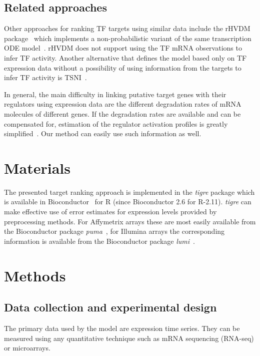 \documentclass[11pt]{article}
\newcommand{\Rpackage}[1]{\emph{#1}}
\newcommand{\tigre}[0]{\Rpackage{tigre}}
\begin{document}
\subsection{Related approaches}

Other approaches for ranking TF targets using similar data include the
rHVDM package~\cite{Barenco2009} which implements a non-probabilistic
variant of the same transcription ODE model~\cite{Barenco2006a}.
rHVDM does not support using the TF mRNA observations to infer TF
activity.  Another alternative that defines the model based only on
TF expression data without a possibility of using information from the
targets to infer TF activity is TSNI~\cite{Gatta2008}.

In general, the main difficulty in linking putative target genes with
their regulators using expression data are the different degradation
rates of mRNA molecules of different genes.  If the degradation rates
are available and can be compensated for, estimation of the regulator
activation profiles is greatly simplified~\cite{Barenco2009a}.  Our
method can easily use such information as well.

\section{Materials}

The presented target ranking approach is implemented in the \tigre{}
package which is available in Bioconductor~\cite{Gentleman2004} for R
(since Bioconductor 2.6 for R-2.11).  \tigre{} can make effective use
of error estimates for expression levels provided by preprocessing
methods.  For Affymetrix arrays these are most easily available from
the Bioconductor package \Rpackage{puma}~\cite{Pearson2009}, for
Illumina arrays the corresponding information is available from the
Bioconductor package \Rpackage{lumi}~\cite{Du2008}.

\section{Methods}

\subsection{Data collection and experimental design}

The primary data used by the model are expression time series.  They
can be measured using any quantitative technique such as mRNA
sequencing (RNA-seq) or microarrays.
\end{document}
